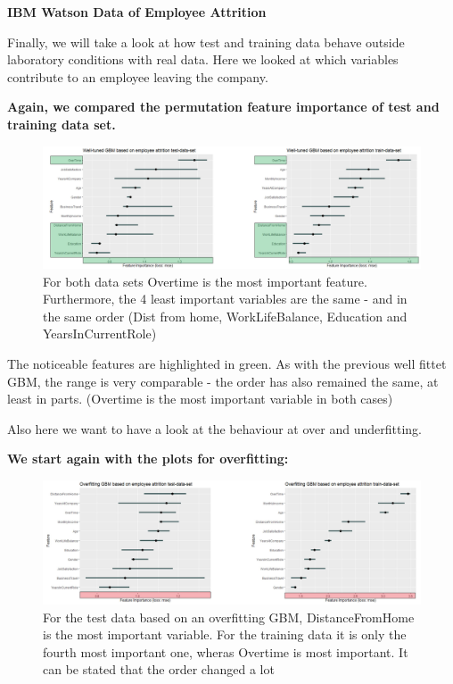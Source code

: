 \documentclass[
]{krantz}
\begin{document}
\textbf{IBM Watson Data of Employee Attrition}

Finally, we will take a look at how test and training data behave outside laboratory conditions with real data. Here we looked at which variables contribute to an employee leaving the company.

\textbf{Again, we compared the permutation feature importance of test and training data set.}

\begin{figure}
\includegraphics[width=40.38in]{images/IBM_well} \caption{For both data sets Overtime is the most important feature. Furthermore, the 4 least important variables are the same - and in the same order (Dist from home, WorkLifeBalance, Education and YearsInCurrentRole)}\label{fig:unnamed-chunk-57}
\end{figure}

The noticeable features are highlighted in green. As with the previous well fittet GBM, the range is very comparable - the order has also remained the same, at least in parts. (Overtime is the most important variable in both cases)

Also here we want to have a look at the behaviour at over and underfitting.

\textbf{We start again with the plots for overfitting:}

\begin{figure}
\includegraphics[width=40.1in]{images/IBM_over} \caption{For the test data based on an overfitting GBM, DistanceFromHome is the most important variable. For the training data it is only the fourth most important one, wheras Overtime is most important. It can be stated that the order changed a lot}\label{fig:unnamed-chunk-58}
\end{figure}
\end{document}
